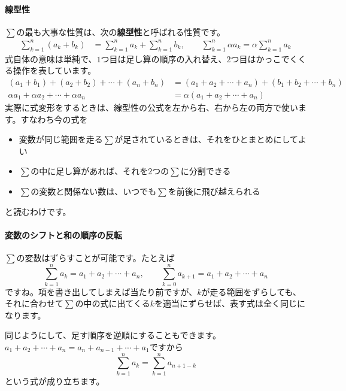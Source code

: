 \paragraph{線型性}
$\sum$の最も大事な性質は、次の\textbf{線型性}と呼ばれる性質です。
\begin{align*}
\sum_{k = 1}^n  (a_k + b_k) &= \sum_{k = 1}^n a_k + \sum_{k = 1}^n b_k, \qquad
\sum_{k = 1}^n \alpha a_k = \alpha \sum_{k = 1}^n a_k
\end{align*}
式自体の意味は単純で、$1$つ目は足し算の順序の入れ替え、$2$つ目はかっこでくくる操作を表しています。
\begin{align*}
(a_1 + b_1) + (a_2 + b_2) + \cdots + (a_n + b_n) &= (a_1 + a_ 2 + \cdots + a_n) + (b_1 + b_2 + \cdots + b_n) \\
\alpha a_1 + \alpha a_2 + \cdots + \alpha a_n &= \alpha (a_1 + a_2 + \cdots + a_n)
\end{align*}
実際に式変形をするときは、線型性の公式を左から右、右から左の両方で使います。すなわち今の式を
\begin{itemize}
\item 変数が同じ範囲を走る$\sum$が足されているときは、それをひとまとめにしてよい
\item $\sum$の中に足し算があれば、それを$2$つの$\sum$に分割できる
\item $\sum$の変数と関係ない数は、いつでも$\sum$を前後に飛び越えられる
\end{itemize}
と読むわけです。

\paragraph{変数のシフトと和の順序の反転}

$\sum$の変数はずらすことが可能です。たとえば
\[
\sum_{k = 1}^n a_k = a_1 + a_2 + \cdots + a_n, \qquad \sum_{k = 0}^n a_{k+1} = a_1 + a_2 + \cdots + a_n
\]
ですね。項を書き出してしまえば当たり前ですが、$k$が走る範囲をずらしても、それに合わせて$\sum$の中の式に出てくる$k$を適当にずらせば、表す式は全く同じになります。

同じようにして、足す順序を逆順にすることもできます。$a_1 + a_2 + \cdots + a_n = a_n + a_{n-1} + \cdots + a_1$ですから
\[
\sum_{k = 1}^n a_k = \sum_{k = 1}^n a_{n+1-k}
\]
という式が成り立ちます。

